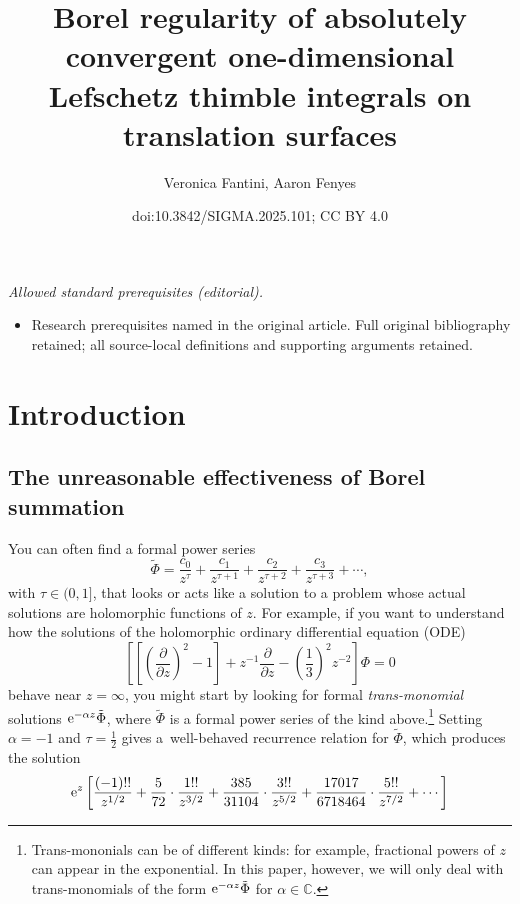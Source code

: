 \documentclass[10pt,a4paper]{amsart}
\title{Borel regularity of absolutely convergent one-dimensional Lefschetz thimble integrals on translation surfaces}
\author{Veronica Fantini, Aaron Fenyes}
\date{doi:10.3842/SIGMA.2025.101; CC BY 4.0}
\newcommand{\C}{\mathbb{C}}
\newcommand{\series}[1]{\tilde{#1}}
\numberwithin{equation}{section}
\begin{document}
\maketitle
\noindent\textit{Allowed standard prerequisites (editorial).}\begin{itemize}
\item Research prerequisites named in the original article. Full original bibliography retained; all source-local definitions and supporting arguments retained.
\end{itemize}\medskip
\section{Introduction}

\subsection{The unreasonable effectiveness of Borel summation}\label{intro:summation}
You can often find a formal power series
\[ \series{\Phi} = \frac{c_0}{z^\tau} + \frac{c_1}{z^{\tau+1}} + \frac{c_2}{z^{\tau+2}} + \frac{c_3}{z^{\tau+3}} + \cdots , \]
with $\tau \in (0, 1]$, that looks or acts like a solution to a problem whose actual solutions are holomorphic functions of $z$. For example, if you want to understand how the solutions of the holomorphic ordinary differential equation (ODE)
\begin{equation}
\left[ \left[ \left(\frac{\partial}{\partial z}\right)^2 - 1 \right] + z^{-1} \frac{\partial}{\partial z} - \left(\frac{1}{3}\right)^2 z^{-2} \right] \Phi= 0 \label{eqn:bessel_rescaled_ex}
\end{equation}
behave near $z = \infty$, you might start by looking for formal {\em trans-monomial} solutions ${\rm e}^{-\alpha z} \series{\Phi}$, where $\series{\Phi}$ is a formal power series of the kind above.\footnote{Trans-mononials can be of different kinds: for example, fractional powers of $z$ can appear in the exponential. In this paper, however, we will only deal with trans-monomials of the form ${\rm e}^{-\alpha z} \series{\Phi}$ for $\alpha \in \C$.} Setting $\alpha = -1$ and $\tau = \frac{1}{2}$ gives a~well-behaved recurrence relation for $\series{\Phi}$, which produces the solution
\begin{equation}
{\rm e}^{z} \left[ \frac{(-1)!!}{z^{1/2}} + \frac{5}{72} \cdot \frac{1!!}{z^{3/2}} + \frac{385}{31104} \cdot \frac{3!!}{z^{5/2}} + \frac{17017}{6718464} \cdot \frac{5!!}{z^{7/2}} + \cdots \right] \label{series:bessel_ex}
\end{equation}
\end{document}

